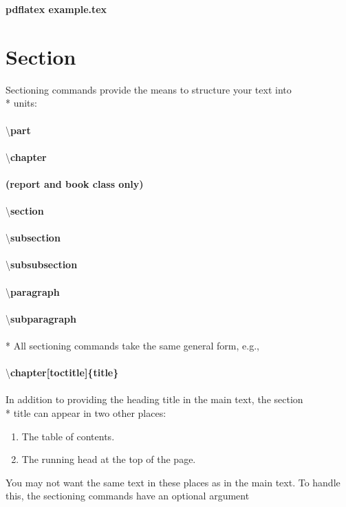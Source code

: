 \documentclass[12pt, a4paper]{article}
\newcommand*{\qcr}{\fontfamily{qcr}\selectfont}
\begin{document}
\textbf{pdflatex example.tex}

\clearpage

\section{Section}
Sectioning commands provide the means to structure your text into
\\*
units:
\\~\\
\newline
{\qcr \large \textbackslash{}\textbf{part}
\\~\\
\textbackslash{}\textbf{chapter}
\\~\\
\textbf{(report and book class only)}
\\~\\
\textbackslash{}\textbf{section}
\\~\\
\textbackslash{}\textbf{subsection}
\\~\\
\textbackslash{}\textbf{subsubsection}
\\~\\
\textbackslash{}\textbf{paragraph}
\\~\\
\textbackslash{}\textbf{subparagraph}\\
}
\\*
\hspace*{0.5cm}All sectioning commands take the same general form, e.g.,
\\~\\
\hspace*{2cm}\textbackslash{}\textbf{\qcr \large chapter[toctitle]\{title\}}
\\~\\
\hspace*{0.5cm}In addition to providing the heading title in the main text, the section
\\*
title can appear in two other places:
\begin{enumerate}
  \item The table of contents.
  \item The running head at the top of the page.
\end{enumerate}
\hspace{0.5cm}You may not want the same text in these places as in the main text.
To handle this, the sectioning commands have an optional argument
\end{document}
